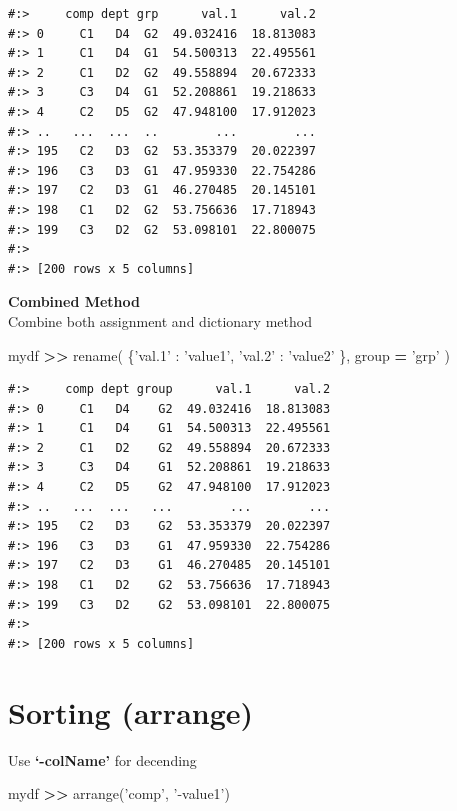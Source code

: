 \documentclass[
]{book}
\newenvironment{Shaded}{\begin{snugshade}}{\end{snugshade}}
\newcommand{\NormalTok}[1]{#1}
\newcommand{\OperatorTok}[1]{\textcolor[rgb]{0.43,0.43,0.43}{\textbf{#1}}}
\newcommand{\StringTok}[1]{\textcolor[rgb]{0.5,0.5,0.5}{#1}}
\begin{document}
\begin{verbatim}
#:>     comp dept grp      val.1      val.2
#:> 0     C1   D4  G2  49.032416  18.813083
#:> 1     C1   D4  G1  54.500313  22.495561
#:> 2     C1   D2  G2  49.558894  20.672333
#:> 3     C3   D4  G1  52.208861  19.218633
#:> 4     C2   D5  G2  47.948100  17.912023
#:> ..   ...  ...  ..        ...        ...
#:> 195   C2   D3  G2  53.353379  20.022397
#:> 196   C3   D3  G1  47.959330  22.754286
#:> 197   C2   D3  G1  46.270485  20.145101
#:> 198   C1   D2  G2  53.756636  17.718943
#:> 199   C3   D2  G2  53.098101  22.800075
#:> 
#:> [200 rows x 5 columns]
\end{verbatim}

\textbf{Combined Method}\\
Combine both assignment and dictionary method

\begin{Shaded}
\begin{Highlighting}[]
\NormalTok{mydf }\OperatorTok{>>}\NormalTok{ rename( \{}\StringTok{'val.1'}\NormalTok{ : }\StringTok{'value1'}\NormalTok{,}
                 \StringTok{'val.2'}\NormalTok{ : }\StringTok{'value2'}
\NormalTok{              \}, group }\OperatorTok{=} \StringTok{'grp'}\NormalTok{ )}
\end{Highlighting}
\end{Shaded}

\begin{verbatim}
#:>     comp dept group      val.1      val.2
#:> 0     C1   D4    G2  49.032416  18.813083
#:> 1     C1   D4    G1  54.500313  22.495561
#:> 2     C1   D2    G2  49.558894  20.672333
#:> 3     C3   D4    G1  52.208861  19.218633
#:> 4     C2   D5    G2  47.948100  17.912023
#:> ..   ...  ...   ...        ...        ...
#:> 195   C2   D3    G2  53.353379  20.022397
#:> 196   C3   D3    G1  47.959330  22.754286
#:> 197   C2   D3    G1  46.270485  20.145101
#:> 198   C1   D2    G2  53.756636  17.718943
#:> 199   C3   D2    G2  53.098101  22.800075
#:> 
#:> [200 rows x 5 columns]
\end{verbatim}

\hypertarget{sorting-arrange}{%
\section{Sorting (arrange)}\label{sorting-arrange}}

Use \textbf{`-colName'} for decending

\begin{Shaded}
\begin{Highlighting}[]
\NormalTok{mydf }\OperatorTok{>>}\NormalTok{ arrange(}\StringTok{'comp'}\NormalTok{, }\StringTok{'-value1'}\NormalTok{)}
\end{Highlighting}
\end{Shaded}
\end{document}
